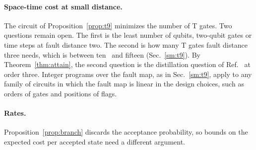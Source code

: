 \documentclass[aps,prl,reprint,twocolumn,amsmath,amssymb,floatfix,nofootinbib,superscriptaddress]{revtex4-2}
\theoremstyle{definition}
\theoremstyle{remark}
\begin{document}
\paragraph*{Space-time cost at small distance.}
The circuit of Proposition~\ref{prop:t9} minimizes the number of T gates. Two questions remain open. The first is the least number of qubits, two-qubit gates or time steps at fault distance two. The second is how many T gates fault distance three needs, which is between ten~\cite{distillationpaper} and fifteen (Sec.~\ref{sm:t9}). By Theorem~\ref{thm:attain}, the second question is the distillation question of Ref.~\cite{distillationpaper} at order three. Integer programs over the fault map, as in Sec.~\ref{sm:t9}, apply to any family of circuits in which the fault map is linear in the design choices, such as orders of gates and positions of flags.

\paragraph*{Rates.}
Proposition~\ref{prop:branch} discards the acceptance probability, so bounds on the expected cost per accepted state need a different argument.
\end{document}
